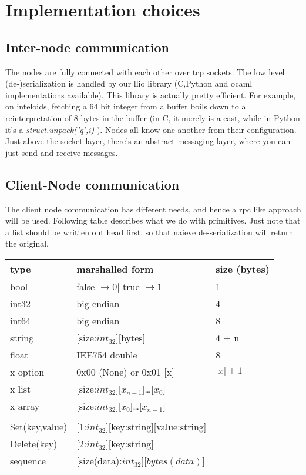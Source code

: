 \section{Implementation choices}
\subsection{Inter-node communication}
The nodes are fully connected with each other over tcp sockets.
The low level (de-)serialization is handled by our llio library (C,Python and ocaml implementations available).
This library is actually pretty efficient.
For example, on inteloids, fetching a 64 bit integer from a buffer boils down to a reinterpretation of 8 bytes in the buffer (in C, it merely is a cast, while in Python it's a \emph{struct.unpack('q',i)} ).
Nodes all know one another from their configuration.
Just above the socket layer, there's an abstract messaging layer, where you can just send and receive messages.



\subsection{Client-Node communication}
The client node communication has different needs, and hence a rpc like approach will be used. Following table describes what we do with primitives.
Just note that a list should be written out head first, so that naieve de-serialization will return the original.
\begin{table}[ht]
\begin{tabular}{lll}
type  &   marshalled form & size (bytes)          \\
\hline
bool        & false $\rightarrow 0 | $ true $ \rightarrow 1   $ & 1 \\
int32       & big endian          & 4             \\
int64       & big endian          & 8             \\
string      & [size:$int_{32}$][bytes] & 4 + n     \\
float       & IEE754 double       & 8             \\
x option    & 0x00 (None) or 0x01 [x] & $|x| + 1$ \\
x list      & [size:$int_{32}$][$x_{n-1}$]\ldots[$x_{0}$] \\
x array     & [size:$int_{32}$][$x_{0}$]\ldots[$x_{n-1}$] \\
\hline \\
Set(key,value) & [1:$int_{32}$][key:string][value:string]\\
Delete(key) & [2:$int_{32}$][key:string]\\
sequence    & [size(data):$int_{32}$][$bytes(data)$] \\
\hline
\end{tabular}
\end{table}

